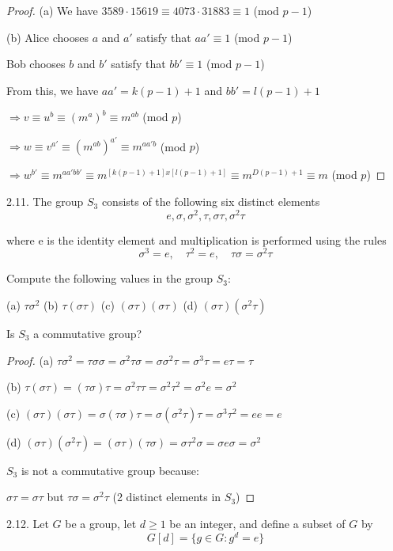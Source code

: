 \begin{proof}

(a) We have $3589 \cdot 15619 \equiv 4073 \cdot 31883 \equiv 1$ (mod $p-1$)

(b) Alice chooses $a$ and $a'$ satisfy that $aa' \equiv 1$ (mod $p-1$)

Bob chooses $b$ and $b'$ satisfy that $bb' \equiv 1$ (mod $p-1$)

From this, we have $aa' = k(p-1)+1$ and $bb' = l(p-1) + 1$

$\Rightarrow v \equiv u^b \equiv (m^a)^b \equiv m^{ab}$ (mod $p$)

$\Rightarrow w \equiv v^{a'} \equiv (m^{ab})^{a'} \equiv m^{aa'b}$ (mod $p$)

$\Rightarrow w^{b'} \equiv m^{aa'bb'} \equiv m^{[k(p-1)+1]x[l(p-1)+1]} \equiv m^{D(p-1)+1} \equiv m$ (mod $p$)
\end{proof}

2.11. The group $S_3$ consists of the following six distinct elements
    \[e, \sigma, \sigma^2, \tau, \sigma\tau, \sigma^2\tau\]

where e is the identity element and multiplication is performed using the rules
    \[\sigma^3 = e, \quad \tau^2 = e, \quad \tau\sigma = \sigma^2\tau\]

Compute the following values in the group $S_3$:

(a)  $\tau\sigma^2$ \quad\quad (b)  $\tau(\sigma\tau)$ \quad\quad (c)  $(\sigma\tau)(\sigma\tau)$ \quad\quad (d)  $(\sigma\tau)(\sigma^2\tau)$

Is $S_3$ a commutative group?

\begin{proof}
(a) $\tau\sigma^2 = \tau\sigma\sigma = \sigma^2\tau\sigma = \sigma\sigma^2\tau = \sigma^3\tau = e\tau = \tau$

(b) $\tau(\sigma\tau)=(\tau\sigma)\tau = \sigma^2\tau\tau = \sigma^2\tau^2 = \sigma^2e = \sigma^2$

(c) $(\sigma\tau)(\sigma\tau) = \sigma(\tau\sigma)\tau=\sigma(\sigma^2\tau)\tau=\sigma^3\tau^2=ee=e$

(d) $(\sigma\tau)(\sigma^2\tau)=(\sigma\tau)(\tau\sigma)=\sigma\tau^2\sigma=\sigma e \sigma = \sigma^2$

$S_3$ is not a commutative group because:

$\sigma\tau = \sigma\tau$ but $\tau\sigma = \sigma^2\tau$ (2 distinct elements in $S_3$)
\end{proof}

2.12. Let $G$ be a group, let $d \geq 1$ be an integer, and define a subset of $G$ by
    \[G[d] = \{g \in G: g^d = e\}\]

